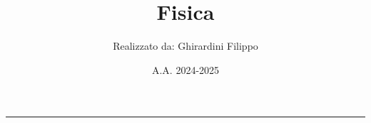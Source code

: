 \documentclass[a4paper,10pt]{article}
\title{\textbf{Fisica}}
\author{Realizzato da: Ghirardini Filippo}
\date{A.A. 2024-2025}
\theoremstyle{remark}
\theoremstyle{definition}
\theoremstyle{plain}
\theoremstyle{definition}
\theoremstyle{definition}
\theoremstyle{definition}
\theoremstyle{plain}
\theoremstyle{plain}
\begin{document}
	
	
	\tableofcontents
	\newpage
	\maketitle
	\begin{center}
		\vspace{-20pt}
		\rule{11cm}{.1pt} 
	\end{center}
	
	
	
\end{document}
